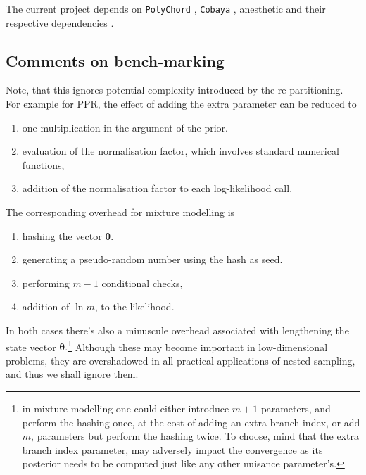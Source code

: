 \documentclass[usenatbib]{mnras}
\begin{document}
The current project depends on \texttt{PolyChord} \cite{polychord}, \texttt{Cobaya}
\cite{cobaya}, anesthetic \cite{anesthetic} and their respective
dependencies \cite{Blas_2011}.
\subsection{Comments on bench-marking}
\label{sec:org50bac21}
Note, that this ignores potential complexity introduced by the
re-partitioning. For example for PPR, the effect of adding the
extra parameter can be reduced to 
\begin{enumerate}
\item one multiplication in the argument of the prior.
\item evaluation of the normalisation factor, which involves standard
numerical functions,
\item addition of the normalisation factor to each log-likelihood call.
\end{enumerate}

The corresponding overhead for mixture modelling is
\begin{enumerate}
\item hashing the vector \(\bm{\theta}\).
\item generating a pseudo-random number using the hash as seed.
\item performing \(m-1\) conditional checks,
\item addition of \(\ln m\), to the likelihood.
\end{enumerate}

In both cases there's also a minuscule overhead associated with
lengthening the state vector \(\bm{\theta}.\)\footnote{in mixture modelling
one could either introduce \(m+1\) parameters, and perform the
hashing once, at the cost of adding an extra branch index, or add
\(m\), parameters but perform the hashing twice. To choose, mind that
the extra branch index parameter, may adversely impact the
convergence as its posterior needs to be computed just like any
other nuisance parameter's.}  Although these may become important
in low-dimensional problems, they are overshadowed in all practical
applications of nested sampling, and thus we shall ignore them.
\end{document}
